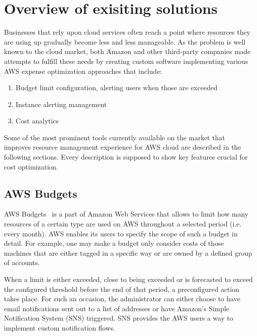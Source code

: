 \documentclass[licencjacka,en]{thesisclass}
\begin{document}
    \section{Overview of exisiting solutions}

    Businesses that rely upon cloud services often reach a point where resources
    they are using up gradually become less and less manageable.
    As the problem is well known to the cloud market, both Amazon
    and other third-party companies made attempts to fulfill these needs
    by creating custom software implementing various AWS expense optimization approaches
    that include:

    \begin{enumerate}
        \item Budget limit configuration, alerting users when those are exceeded
        \item Instance alerting management
        \item Cost analytics
    \end{enumerate}

    Some of the most prominent tools currently available
    on the market that improves resource management experience
    for AWS cloud are described in the following sections.
    Every description is supposed to show key features crucial for cost optimization.

    \subsection{AWS Budgets}

    AWS Budgets~\cite{AWSDocs} is a part of Amazon Web Services that allows
    to limit how many resources of a certain type are used on AWS
    throughout a selected period (i.e. every month).
    AWS enables its users to specify the scope of such a budget in detail.
    For example, one may make a budget only consider costs of those machines
    that are either tagged in a specific way
    or are owned by a defined group of accounts.

    When a limit is either exceeded, close to being exceeded or is forecasted
    to exceed the configured threshold before the end of that period,
    a preconfigured action takes place.
    For such an occasion, the administrator can either choose
    to have email notifications sent out to a list of addresses
    or have Amazon's Simple Notification System (SNS) triggered.
    SNS provides the AWS users a way to implement custom notification flows.
\end{document}
